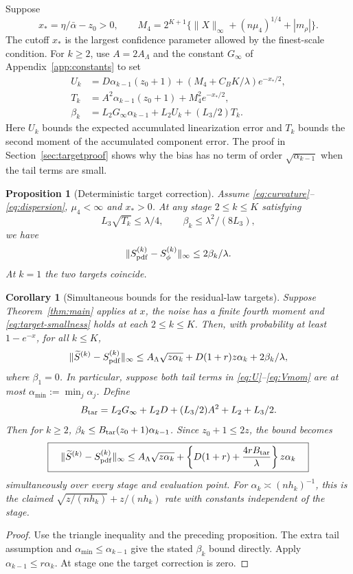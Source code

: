 \documentclass[11pt]{article}
\newcommand{\norm}[1]{\lVert#1\rVert}
\newtheorem{proposition}[theorem]{Proposition}
\newtheorem{corollary}[theorem]{Corollary}
\theoremstyle{remark}
\begin{document}
Suppose
\[
 x_*=\eta/\bar\alpha-z_0>0,\qquad
 M_4=2^{K+1}\{\norm X_\infty+(n\mu_4)^{1/4}+|m_\rho|\}.
\]
The cutoff \(x_*\) is the largest confidence parameter allowed by the
finest-scale condition. For \(k\ge2\), use \(A=2A_\Lambda\) and the
constant \(G_\infty\) of Appendix~\ref{app:constants} to set
\begin{align}
 U_k&=D\alpha_{k-1}(z_0+1)
       +(M_4+C_BK/\lambda)e^{-x_*/2},\label{eq:U}\\
 T_k&=A^2\alpha_{k-1}(z_0+1)+M_4^2e^{-x_*/2},\label{eq:Vmom}\\
 \beta_k&=L_2G_\infty\alpha_{k-1}
                  +L_2U_k+(L_3/2)T_k.\label{eq:beta}
\end{align}
Here \(U_k\) bounds the expected accumulated linearization error and
\(T_k\) bounds the second moment of the accumulated component error. The proof in Section~\ref{sec:targetproof} shows why the bias has no term of order \(\sqrt{\alpha_{k-1}}\) when the tail terms are small.

\begin{proposition}[Deterministic target correction]\label{prop:targets}
Assume \eqref{eq:curvature}--\eqref{eq:dispersion}, \(\mu_4<\infty\) and
\(x_*>0\). At any stage \(2\le k\le K\) satisfying
\begin{equation}
 L_3\sqrt{T_k}\le\lambda/4,\qquad
 \beta_k\le\lambda^2/(8L_3),\label{eq:target-smallness}
\end{equation}
we have
\[
 \norm{S_{\rm pdf}^{(k)}-S_\phi^{(k)}}_\infty
       \le2\beta_k/\lambda.
\]
At \(k=1\) the two targets coincide.
\end{proposition}
\begin{corollary}[Simultaneous bounds for the residual-law targets]\label{cor:pdf}
Suppose Theorem~\ref{thm:main} applies at \(x\), the noise has a finite
fourth moment and \eqref{eq:target-smallness} holds at each \(2\le k\le K\).
Then, with
probability at least \(1-e^{-x}\), for all \(k\le K\),
\[
 \norm{\widetilde S^{(k)}-S_{\rm pdf}^{(k)}}_\infty
 \le A_\Lambda\sqrt{z\alpha_k}+D(1+r)z\alpha_k+2\beta_k/\lambda,
\]
where \(\beta_1=0\).
In particular, suppose both tail terms in \eqref{eq:U}--\eqref{eq:Vmom}
are at most \(\alpha_{\min}:=\min_j\alpha_j\). Define
\[
 B_{\rm tar}=L_2G_\infty+L_2D+(L_3/2)A^2+L_2+L_3/2.
\]
Then for \(k\ge2\), \(\beta_k\le B_{\rm tar}(z_0+1)\alpha_{k-1}\).
Since \(z_0+1\le2z\), the bound becomes
\[
 \boxed{\quad
 \norm{\widetilde S^{(k)}-S_{\rm pdf}^{(k)}}_\infty
 \le A_\Lambda\sqrt{z\alpha_k}
     +\left\{D(1+r)+\frac{4rB_{\rm tar}}{\lambda}\right\}z\alpha_k
 \quad}
\]
simultaneously over every stage and evaluation point.
For \(\alpha_k\asymp(nh_k)^{-1}\), this is the claimed
\(\sqrt{z/(nh_k)}+z/(nh_k)\) rate with constants independent of the stage.
\end{corollary}
\begin{proof}
Use the triangle inequality and the preceding proposition.
The extra tail assumption and \(\alpha_{\min}\le\alpha_{k-1}\) give the
stated \(\beta_k\) bound directly. Apply
\(\alpha_{k-1}\le r\alpha_k\). At stage one the target correction is zero.
\end{proof}
\end{document}

